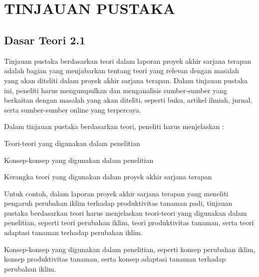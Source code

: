 
\chapter[TINJAUAN PUSTAKA]{\\ TINJAUAN PUSTAKA}

\section{Dasar Teori 2.1}
Tinjauan pustaka berdasarkan teori dalam laporan proyek akhir sarjana terapan adalah bagian yang menjabarkan tentang teori yang relevan dengan masalah yang akan diteliti dalam proyek akhir sarjana terapan. Dalam tinjauan pustaka ini, peneliti harus mengumpulkan dan menganalisis sumber-sumber yang berkaitan dengan masalah yang akan diteliti, seperti buku, artikel ilmiah, jurnal, serta sumber-sumber online yang terpercaya.

Dalam tinjauan pustaka berdasarkan teori, peneliti harus menjelaskan :
\begin{packed_item}
    \item Teori-teori yang digunakan dalam penelitian
    \item Konsep-konsep yang digunakan dalam penelitian
    \item Kerangka teori yang digunakan dalam proyek akhir sarjana terapan
\end{packed_item}

Untuk contoh, dalam laporan proyek akhir sarjana terapan yang meneliti pengaruh perubahan iklim terhadap produktivitas tanaman padi, tinjauan pustaka berdasarkan teori harus menjelaskan teori-teori yang digunakan dalam penelitian, seperti teori perubahan iklim, teori produktivitas tanaman, serta teori adaptasi tanaman terhadap perubahan iklim.

Konsep-konsep yang digunakan dalam penelitian, seperti konsep perubahan iklim, konsep produktivitas tanaman, serta konsep adaptasi tanaman terhadap perubahan iklim.

